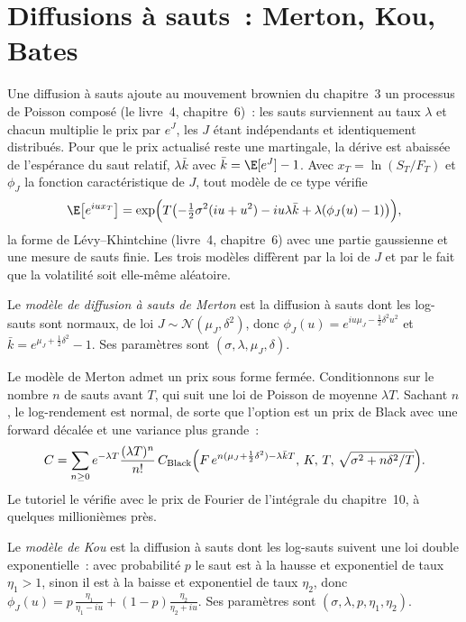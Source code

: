 \section{Diffusions à sauts~: Merton, Kou, Bates}

Une diffusion à sauts ajoute au mouvement brownien du chapitre~3 un processus de Poisson composé (le livre~4,
chapitre~6)~: les sauts surviennent au taux $\lambda$ et chacun multiplie le prix par $e^{J}$, les $J$ étant indépendants et
identiquement distribués. Pour que le prix actualisé reste une martingale, la dérive est abaissée de
l'espérance du saut relatif, $\lambda\bar k$ avec $\bar k=\E[e^J]-1$. Avec $x_T=\ln(S_T/F_T)$ et $\phi_J$ la
fonction caractéristique de $J$, tout modèle de ce type vérifie
\[
\E\bigl[e^{iux_T}\bigr]=\exp\Bigl(T\bigl(-\tfrac12\sigma^2(iu+u^2)-iu\lambda\bar k+\lambda(\phi_J(u)-1)\bigr)\Bigr),
\]
la forme de Lévy--Khintchine (livre~4, chapitre~6) avec une partie gaussienne et une mesure de sauts finie. Les trois
modèles diffèrent par la loi de $J$ et par le fait que la volatilité soit elle-même aléatoire.

\begin{definition}\label{def:dv:jumps-and-levy-models:merton}
Le \emph{modèle de diffusion à sauts de Merton} est la diffusion à sauts dont les log-sauts sont normaux,
de loi $J\sim\mathcal N(\mu_J,\delta^2)$, donc $\phi_J(u)=e^{iu\mu_J-\frac12\delta^2u^2}$ et
$\bar k=e^{\mu_J+\frac12\delta^2}-1$. Ses paramètres sont $(\sigma,\lambda,\mu_J,\delta)$.
\end{definition}

Le modèle de Merton admet un prix sous forme fermée. Conditionnons sur le nombre $n$ de sauts avant $T$, qui suit une loi de Poisson de
moyenne $\lambda T$. Sachant $n$, le log-rendement est normal, de sorte que l'option est un prix de Black avec une forward décalée et
une variance plus grande~:
\[
C=\sum_{n\ge0}e^{-\lambda T}\frac{(\lambda T)^n}{n!}\,C_{\mathrm{Black}}\Bigl(F\,e^{n(\mu_J+\frac12\delta^2)-\lambda\bar kT},\,K,\,T,\,
\sqrt{\sigma^2+n\delta^2/T}\Bigr).
\]
Le tutoriel le vérifie avec le prix de Fourier de l'intégrale du chapitre~10, à quelques millionièmes près.

\begin{definition}\label{def:dv:jumps-and-levy-models:kou}
Le \emph{modèle de Kou} est la diffusion à sauts dont les log-sauts suivent une loi double exponentielle~: avec probabilité
$p$ le saut est à la hausse et exponentiel de taux $\eta_1>1$, sinon il est à la baisse et exponentiel de taux $\eta_2$, donc
$\phi_J(u)=p\,\frac{\eta_1}{\eta_1-iu}+(1-p)\frac{\eta_2}{\eta_2+iu}$. Ses paramètres sont
$(\sigma,\lambda,p,\eta_1,\eta_2)$.
\end{definition}

